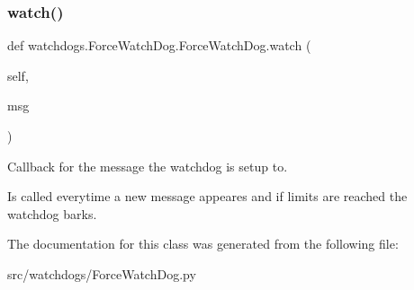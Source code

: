 \subsubsection{\texorpdfstring{watch()}{watch()}}
{\footnotesize\ttfamily def watchdogs.\+Force\+Watch\+Dog.\+Force\+Watch\+Dog.\+watch (\begin{DoxyParamCaption}\item[{}]{self,  }\item[{}]{msg }\end{DoxyParamCaption})}

\begin{DoxyVerb}Callback for the message the watchdog is setup to.

Is called everytime a new message appeares and if limits are reached the watchdog barks.
\end{DoxyVerb}
 

The documentation for this class was generated from the following file\+:\begin{DoxyCompactItemize}
\item 
src/watchdogs/Force\+Watch\+Dog.\+py\end{DoxyCompactItemize}

